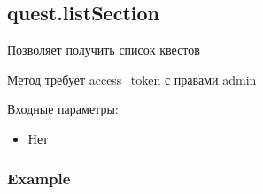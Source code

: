 \subsection{quest.listSection}

Позволяет получить список квестов

Метод требует access\_token с правами admin

Входные параметры:
\begin{itemize}
	\item Нет
\end{itemize}

\subsubsection{Example}
\begin{Verbatim}[frame=single]

\end{Verbatim}
